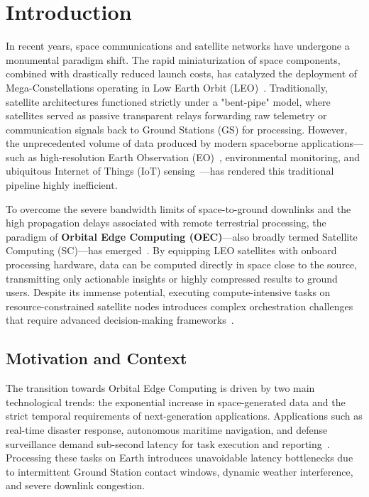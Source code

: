 \chapter{Introduction}
\label{chap:introduction}

In recent years, space communications and satellite networks have undergone a monumental paradigm shift. The rapid miniaturization of space components, combined with drastically reduced launch costs, has catalyzed the deployment of Mega-Constellations operating in Low Earth Orbit (LEO)~\cite{survey_orbital_edge_2023}. Traditionally, satellite architectures functioned strictly under a "bent-pipe" model, where satellites served as passive transparent relays forwarding raw telemetry or communication signals back to Ground Stations (GS) for processing. However, the unprecedented volume of data produced by modern spaceborne applications—such as high-resolution Earth Observation (EO)~\cite{leyva2023satellite}, environmental monitoring, and ubiquitous Internet of Things (IoT) sensing~\cite{tiansuan2023}—has rendered this traditional pipeline highly inefficient. 

To overcome the severe bandwidth limits of space-to-ground downlinks and the high propagation delays associated with remote terrestrial processing, the paradigm of \textbf{Orbital Edge Computing (OEC)}—also broadly termed Satellite Computing (SC)—has emerged~\cite{denby2019orbital, denby2020asplos}. By equipping LEO satellites with onboard processing hardware, data can be computed directly in space close to the source, transmitting only actionable insights or highly compressed results to ground users. Despite its immense potential, executing compute-intensive tasks on resource-constrained satellite nodes introduces complex orchestration challenges that require advanced decision-making frameworks~\cite{survey_orbital_edge_2023, icdcs_satellite_2025}.

\section{Motivation and Context}
\label{sec:intro_motivation}

The transition towards Orbital Edge Computing is driven by two main technological trends: the exponential increase in space-generated data and the strict temporal requirements of next-generation applications. Applications such as real-time disaster response, autonomous maritime navigation, and defense surveillance demand sub-second latency for task execution and reporting~\cite{leyva2023satellite}. Processing these tasks on Earth introduces unavoidable latency bottlenecks due to intermittent Ground Station contact windows, dynamic weather interference, and severe downlink congestion.

